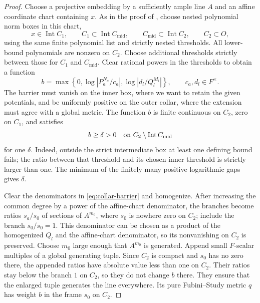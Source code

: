 \documentclass[11pt,reqno]{amsart}
\theoremstyle{definition}
\theoremstyle{remark}
\numberwithin{equation}{section}
\begin{document}
\begin{proof}
Choose a projective embedding by a sufficiently ample line \(A\)
and an affine coordinate chart containing \(x\).
As in the proof of , choose nested polynomial
norm boxes in this chart,
\[
 x\in\operatorname{Int}C_1,\qquad
 C_1\subset\operatorname{Int}C_{\mathrm{mid}},\qquad
 C_{\mathrm{mid}}\subset\operatorname{Int}C_2,\qquad C_2\subset O,
\]
using the same finite polynomial list and strictly nested thresholds.
All lower-bound polynomials are nonzero on \(C_2\).
Choose additional thresholds strictly between those for \(C_1\)
and \(C_{\mathrm{mid}}\).
Clear rational powers in the thresholds to obtain a function
\begin{equation}\label{eq:collar-barrier}
 b=\max\left\{0,\log|P_a^{N_a}/c_a|,
                    \log|d_l/Q_l^{M_l}|\right\},
 \qquad c_a,d_l\in F^\times .
\end{equation}
The barrier must vanish on the inner box, where we want to retain
the given potentials, and be uniformly positive on the outer collar,
where the extension must agree with a global metric. The function
$b$ is finite continuous on $C_2$, zero on $C_1$, and satisfies
\[
 b\ge\delta>0\quad\hbox{on }C_2\setminus\operatorname{Int}C_{\mathrm{mid}}
\]
for one \(\delta\).
Indeed, outside the strict intermediate box at least one defining
bound fails; the ratio between that threshold and its chosen inner
threshold is strictly larger than one. The minimum of the finitely
many positive logarithmic gaps gives \(\delta\).

Clear the denominators in \eqref{eq:collar-barrier} and homogenize.
After increasing the common degree by a power of the affine-chart
denominator, the branches become ratios \(s_a/s_0\) of sections of
\(A^{m_0}\), where \(s_0\) is nowhere zero on \(C_2\); include
the branch \(s_0/s_0=1\). This denominator can be chosen as a product
of the homogenized \(Q_l\) and the affine-chart denominator, so its
nonvanishing on \(C_2\) is preserved.
Choose \(m_0\) large enough that \(A^{m_0}\) is generated.
Append small \(F\)-scalar multiples of a global generating tuple.
Since \(C_2\) is compact and \(s_0\) has no zero there, the appended
ratios have absolute value less than one on \(C_2\).
Their ratios stay below the branch $1$ on $C_2$, so they do not
change $b$ there. They ensure that the enlarged tuple generates the
line everywhere. Its pure Fubini--Study metric \(q\) has
weight \(b\) in the frame \(s_0\) on \(C_2\).


\end{proof}
\end{document}
